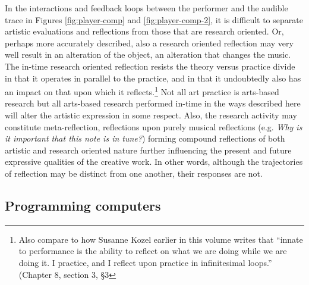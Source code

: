 In the interactions and feedback loops between the performer and the audible trace in Figures \ref{fig:player-comp} and \ref{fig:player-comp-2}, it is difficult to separate artistic evaluations and reflections from those that are research oriented. Or, perhaps more accurately described, also a research oriented reflection may very well result in an alteration of the object, an alteration that changes the music. The in-time research oriented reflection resists the theory versus practice divide in that it operates in parallel to the practice, and in that it undoubtedly also has an impact on that upon which it reflects.\footnote{Also compare to how Susanne Kozel earlier in this volume writes that ``innate to performance is the ability to reflect on what we are doing while we are doing it. I practice, and I reflect upon practice in infinitesimal loops.'' (Chapter 8, section 3, \S3} Not all art practice is arts-based research but all arts-based research performed in-time in the ways described here will alter the artistic expression in some respect. Also, the research activity may constitute meta-reflection, reflections upon purely musical reflections (e.g. \emph{Why is it important that this note is in tune?}) forming compound reflections of both artistic and research oriented nature further influencing the present and future expressive qualities of the creative work. In other words, although the trajectories of reflection may be distinct from one another, their responses are not. 

\subsection{Programming computers}
\label{sec:progr-comp}

